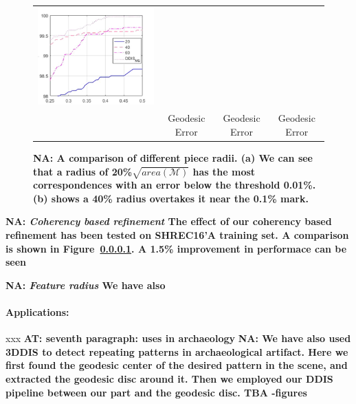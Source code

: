 \documentclass[10pt,twocolumn,letterpaper]{article}
\newcommand{\colornote}[3]{{\color{#1}\bf{#2: #3}\normalfont}}
\newcommand{\colornote}[3]{}
\newcommand {\ayellet}[1]{\colornote{blue}{AT}{#1}}
\newcommand {\nadav}[1]{\colornote{red}{NA}{#1}}
\begin{document}
{\begin{figure}[htb]
\begin{tabular}{cccc}
		\includegraphics[scale=0.5]{figures/PieceSizeHigh.png}
		\\
		& Geodesic Error &  Geodesic Error &  Geodesic Error\\
	\end{tabular}
	\caption{\nadav{{\bf A comparison of different piece radii}. (a) We can see that a radius of 20\%$\sqrt{area(\mathcal{M})}$ has the most correspondences with an error below the threshold 0.01\%.(b) shows a 40\% radius overtakes it near the 0.1\% mark.}} 
		\label{fig:DifferentRadii}
\end{figure}
}

\nadav{\textit{Coherency based refinement} The effect of our coherency based refinement has been tested on SHREC16'A training set. A comparison is shown in Figure~\ref{}. A 1.5\% improvement in performace can be seen}

\nadav{
\textit{Feature radius} We have also 
}
\paragraph{Applications:} xxx
\ayellet{seventh paragraph: uses in archaeology}
\nadav{We have also used 3DDIS to detect repeating patterns in archaeological artifact. 
Here we first found the geodesic center of the desired pattern in the scene, and extracted the geodesic disc around it.
Then we employed our DDIS pipeline between our part and the geodesic disc. TBA -figures}


{\small

}
\end{document}
